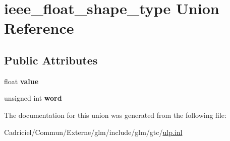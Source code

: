\hypertarget{unionieee__float__shape__type}{}\section{ieee\+\_\+float\+\_\+shape\+\_\+type Union Reference}
\label{unionieee__float__shape__type}
\subsection*{Public Attributes}
\begin{DoxyCompactItemize}
\item 
float {\bfseries value}\hypertarget{unionieee__float__shape__type_aa0c47451f1b974421cbb9e2833ddb68e}{}\label{unionieee__float__shape__type_aa0c47451f1b974421cbb9e2833ddb68e}

\item 
unsigned int {\bfseries word}\hypertarget{unionieee__float__shape__type_a49230c21acd672d044f38b1abcbd6071}{}\label{unionieee__float__shape__type_a49230c21acd672d044f38b1abcbd6071}

\end{DoxyCompactItemize}


The documentation for this union was generated from the following file\+:\begin{DoxyCompactItemize}
\item 
Cadriciel/\+Commun/\+Externe/glm/include/glm/gtc/\hyperlink{ulp_8inl}{ulp.\+inl}\end{DoxyCompactItemize}

